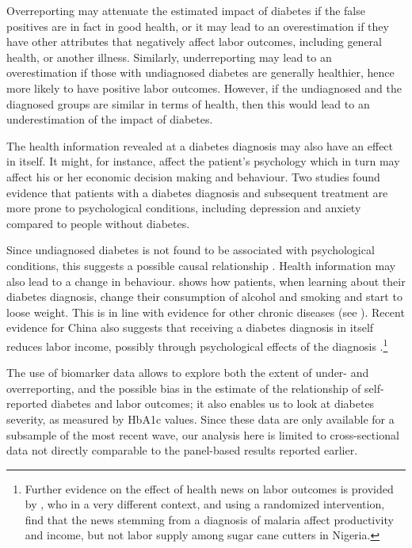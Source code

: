 \documentclass[12pt,english]{article}
\begin{document}
Overreporting may attenuate the estimated impact of diabetes if the false positives are in fact in good health, or it may lead to an overestimation if they have other attributes that negatively affect labor outcomes, including general health, or another illness. Similarly, underreporting may lead to an overestimation if those with undiagnosed diabetes are generally healthier, hence more likely to have positive labor outcomes. However, if the undiagnosed and the diagnosed groups are similar in terms of health, then this would lead to an underestimation of the impact of diabetes. 

The health information revealed at a diabetes diagnosis may also have an effect in itself. It might, for instance, affect the patient's psychology which in turn may affect his or her economic decision making and behaviour. Two studies found evidence that patients with a diabetes diagnosis and subsequent treatment are more prone to psychological conditions, including depression and anxiety \parencite{Thoolen2006,Paddison2011} compared to people without diabetes.

Since undiagnosed diabetes is not found to be associated with psychological conditions, this suggests a possible causal relationship \parencite{Nouwen2011}. Health information may also lead to a change in behaviour. \textcite{Slade2012} shows how patients, when learning about their diabetes diagnosis, change their consumption of alcohol and smoking and start to loose weight. This is in line with evidence for other chronic diseases (see \textcite{Baird2014,Gong2015,Thornton2008,Zhao2013a}). 
Recent evidence for China also suggests that receiving a diabetes diagnosis in itself reduces labor income, possibly through psychological effects of the diagnosis \parencite{Liu2014}.\footnote{Further evidence on the effect of health news on labor outcomes is provided by \textcite{Dillon2014}, who in a very different context, and using a randomized intervention, find that the news stemming from a diagnosis of malaria affect productivity and income, but not labor supply among sugar cane cutters in Nigeria.} 


The use of biomarker data allows to explore both the extent of under- and overreporting, and the possible bias in the estimate of the relationship of self-reported diabetes and labor outcomes; it also enables us to look at diabetes severity, as measured by \ac{HbA1c} values. Since these data are only available for a subsample of the most recent wave, our analysis here is limited to cross-sectional data not directly comparable to the panel-based results reported earlier.
\end{document}
